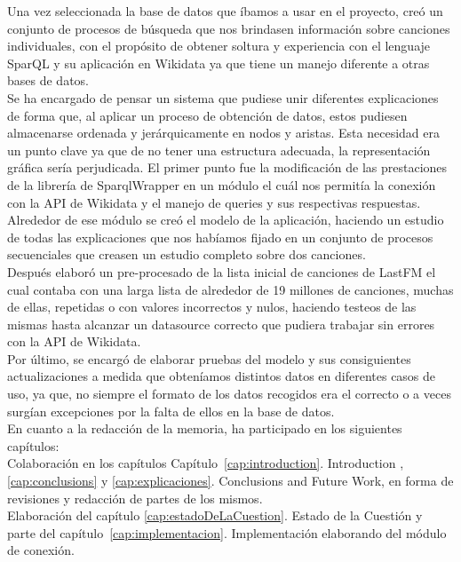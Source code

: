 Una vez seleccionada la base de datos que íbamos a usar en el proyecto, creó un conjunto de procesos de búsqueda que nos brindasen información sobre canciones individuales, con el propósito de obtener soltura y experiencia con el lenguaje SparQL y su aplicación en Wikidata ya que tiene un manejo diferente a otras bases de datos.\\

Se ha encargado de pensar un sistema que pudiese unir diferentes explicaciones de forma que, al aplicar un proceso de obtención de datos, estos pudiesen almacenarse ordenada y jerárquicamente en nodos y aristas. Esta necesidad era un punto clave ya que de no tener una estructura adecuada, la representación gráfica sería perjudicada. El primer punto fue la modificación de las prestaciones de la librería de SparqlWrapper en un módulo el cuál nos permitía la conexión con la API de Wikidata y el manejo de queries y sus respectivas respuestas. Alrededor de ese módulo se creó el modelo de la aplicación, haciendo un estudio de todas las explicaciones que nos habíamos fijado en un conjunto de procesos secuenciales que creasen un estudio completo sobre dos canciones.\\

Después elaboró un pre-procesado de la lista inicial de canciones de LastFM el cual contaba con una larga lista de alrededor de 19 millones de canciones, muchas de ellas, repetidas o con valores incorrectos y nulos, haciendo testeos de las mismas hasta alcanzar un datasource correcto que pudiera trabajar sin errores con la API de Wikidata.\\

Por último, se encargó de elaborar pruebas del modelo y sus consiguientes actualizaciones a medida que obteníamos distintos datos en diferentes casos de uso, ya que, no siempre el formato de los datos recogidos era el correcto o a veces surgían excepciones por la falta de ellos en la base de datos.\\

En cuanto a la redacción de la memoria, ha participado en los siguientes capítulos:\\

Colaboración en los capítulos Capítulo~\ref{cap:introduction}. Introduction , \ref{cap:conclusions} y \ref{cap:explicaciones}. Conclusions and Future Work, en forma de revisiones y redacción de partes de los mismos.\\

Elaboración del capítulo \ref{cap:estadoDeLaCuestion}. Estado de la Cuestión y parte del capítulo~\ref{cap:implementacion}. Implementación elaborando del módulo de conexión.


